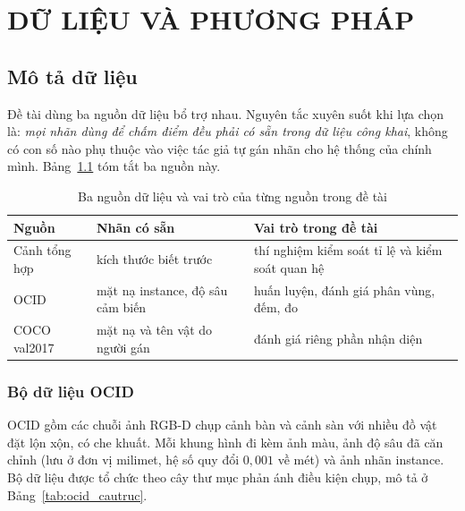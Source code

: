 \chapter{DỮ LIỆU VÀ PHƯƠNG PHÁP}
\label{ch:phuong_phap}

\section{Mô tả dữ liệu}

Đề tài dùng ba nguồn dữ liệu bổ trợ nhau. Nguyên tắc xuyên suốt khi lựa chọn là: \emph{mọi nhãn
dùng để chấm điểm đều phải có sẵn trong dữ liệu công khai}, không có con số nào phụ thuộc vào
việc tác giả tự gán nhãn cho hệ thống của chính mình. Bảng~\ref{tab:nguon_dulieu} tóm tắt ba
nguồn này.

\begin{table}[H]
\centering
\caption{Ba nguồn dữ liệu và vai trò của từng nguồn trong đề tài}
\label{tab:nguon_dulieu}
\small
\begin{tabularx}{\textwidth}{l l X}
\toprule
\textbf{Nguồn} & \textbf{Nhãn có sẵn} & \textbf{Vai trò trong đề tài} \\
\midrule
Cảnh tổng hợp & kích thước biết trước & thí nghiệm kiểm soát tỉ lệ và kiểm soát quan hệ \\
OCID & mặt nạ instance, độ sâu cảm biến & huấn luyện, đánh giá phân vùng, đếm, đo \\
COCO val2017 & mặt nạ và tên vật do người gán & đánh giá riêng phần nhận diện \\
\bottomrule
\end{tabularx}
\end{table}

\subsection{Bộ dữ liệu OCID}

OCID \cite{suchi2019ocid} gồm các chuỗi ảnh RGB-D chụp cảnh bàn và cảnh sàn với nhiều đồ vật đặt
lộn xộn, có che khuất. Mỗi khung hình đi kèm ảnh màu, ảnh độ sâu đã căn chỉnh (lưu ở đơn vị
milimet, hệ số quy đổi $0{,}001$ về mét) và ảnh nhãn instance. Bộ dữ liệu được tổ chức theo cây
thư mục phản ánh điều kiện chụp, mô tả ở Bảng~\ref{tab:ocid_cautruc}.

